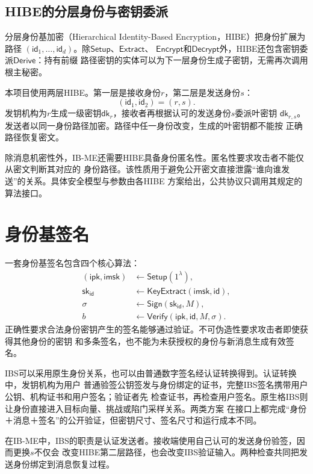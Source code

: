 \subsection{HIBE的分层身份与密钥委派}

分层身份基加密（Hierarchical Identity-Based Encryption，HIBE）把身份扩展为路径
$(\mathsf{id}_1,\ldots,\mathsf{id}_d)$。除$\mathsf{Setup}$、$\mathsf{Extract}$、
$\mathsf{Encrypt}$和$\mathsf{Decrypt}$外，HIBE还包含密钥委派$\mathsf{Derive}$：持有前缀
路径密钥的实体可以为下一层身份生成子密钥，无需再次调用根主秘密。

本项目使用两层HIBE。第一层是接收身份$r$，第二层是发送身份$s$：
\[
  (\mathsf{id}_1,\mathsf{id}_2)=(r,s).
\]
发钥机构为$r$生成一级密钥$\mathsf{dk}_r$，接收者再根据认可的发送身份$s$委派叶密钥
$\mathsf{dk}_{r,s}$。发送者以同一身份路径加密。路径中任一身份改变，生成的叶密钥都不能按
正确路径恢复密文。

除消息机密性外，IB-ME还需要HIBE具备身份匿名性。匿名性要求攻击者不能仅从密文判断其对应的
身份路径。该性质用于避免公开密文直接泄露“谁向谁发送”的关系。具体安全模型与参数由各HIBE
方案给出，公共协议只调用其规定的算法接口。

\section{身份基签名}

一套身份基签名包含四个核心算法：
\[
\begin{aligned}
 (\mathsf{ipk},\mathsf{imsk})&\leftarrow\mathsf{Setup}(1^\lambda),\\
 \mathsf{sk}_{\mathsf{id}}&\leftarrow\mathsf{KeyExtract}(\mathsf{imsk},\mathsf{id}),\\
 \sigma&\leftarrow\mathsf{Sign}(\mathsf{sk}_{\mathsf{id}},M),\\
 b&\leftarrow\mathsf{Verify}(\mathsf{ipk},\mathsf{id},M,\sigma).
\end{aligned}
\]
正确性要求合法身份密钥产生的签名能够通过验证。不可伪造性要求攻击者即使获得其他身份的密钥
和多条签名，也不能为未获授权的身份与新消息生成有效签名。

IBS可以采用原生身份关系，也可以由普通数字签名经认证转换得到。认证转换中，发钥机构为用户
普通验签公钥签发与身份绑定的证书，完整IBS签名携带用户公钥、机构证书和用户签名；验证者先
检查证书，再检查用户签名。原生格IBS则让身份直接进入目标向量、挑战或陷门采样关系。两类方案
在接口上都完成“身份＋消息＋签名”的公开验证，但密钥尺寸、签名尺寸和运行成本不同。

在IB-ME中，IBS的职责是认证发送者。接收端使用自己认可的发送身份验签，因而更换$s$不仅会
改变HIBE第二层路径，也会改变IBS验证输入。两种检查共同把发送身份绑定到消息恢复过程。

